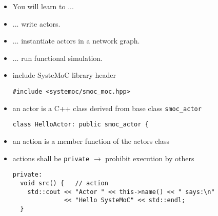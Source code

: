 \begin{frame}
\begin{itemize}
\item You will learn to ...
\item ... write actors.
\item ... instantiate actors in a network graph.
\item ... run functional simulation.
\end{itemize}
\end{frame}




\begin{frame}[fragile=singleslide]
\begin{itemize}
\item include SysteMoC library header
\begin{lstlisting}
#include <systemoc/smoc_moc.hpp>
\end{lstlisting}
\item an actor is a C++ class derived from base class \lstinline!smoc_actor!
\begin{lstlisting}
class HelloActor: public smoc_actor {
\end{lstlisting}
\item an action is a member function of the actors class
\item actions shall be \lstinline!private! $\rightarrow$ prohibit execution by others
\begin{lstlisting}
private:
  void src() {   // action
    std::cout << "Actor " << this->name() << " says:\n"
              << "Hello SysteMoC" << std::endl;
  }
\end{lstlisting}
\end{itemize}
\end{frame}

